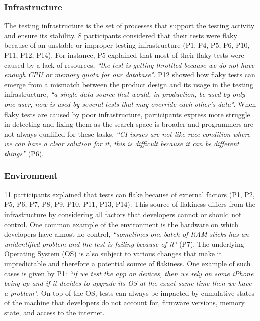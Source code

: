 \subsubsection{\textbf{Infrastructure}}
The testing infrastructure is the set of processes that support the testing activity and ensure its stability.
8 participants considered that their tests were flaky because of an unstable or improper testing infrastructure (P1, P4, P5, P6, P10, P11, P12, P14).
For instance, P5 explained that most of their flaky tests were caused by a lack of resources, \textit{``the test is getting throttled because we do not have enough CPU or memory quota for our database"}.
P12 showed how flaky tests can emerge from a mismatch between the product design and its usage in the testing infrastructure, \textit{``a single data source that would, in production, be used by only one user, now is used by several tests that may override each other's data"}.
When flaky tests are caused by poor infrastructure, participants express more struggle in detecting and fixing them as the search space is broader and programmers are not always qualified for these tasks, \textit{``CI issues are not like race condition where we can have a clear solution for it, this is difficult because it can be different things''} (P6).


\subsubsection{\textbf{Environment}}
11 participants explained that tests can flake because of external factors (P1, P2, P5, P6, P7, P8, P9, P10, P11, P13, P14). 
This source of flakiness differs from the infrastructure by considering all factors that developers cannot or should not control.
One common example of the environment is the hardware on which developers have almost no control, \textit{``sometimes one batch of RAM sticks has an unidentified problem and the test is failing because of it"} (P7). 
The underlying Operating System (OS) is also subject to various changes that make it unpredictable and therefore a potential source of flakiness.
One example of such cases is given by P1: \textit{``if we test the app on devices, then we rely on some iPhone being up and if it decides to upgrade its OS at the exact same time then we have a problem"}.
On top of the OS, tests can always be impacted by cumulative states of the machine that developers do not account for, \eg firmware versions, memory state, and access to the internet.

